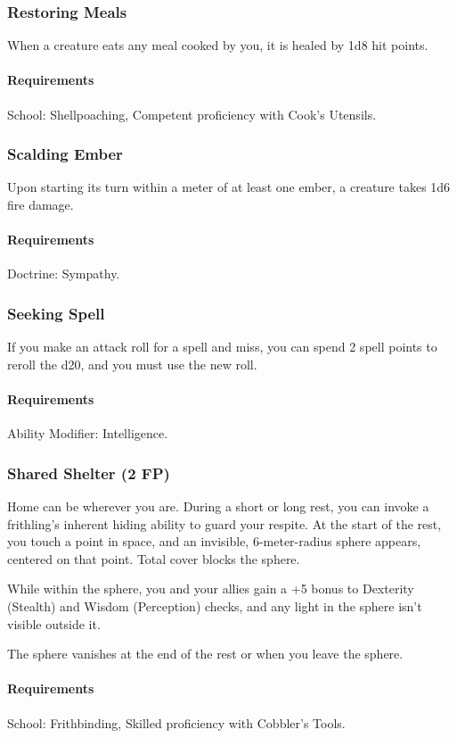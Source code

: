\subsubsection{Restoring Meals} \label{feat::restoringmeals}
    When a creature eats any meal cooked by you, it is healed by 1d8 hit points.
    \paragraph{Requirements} School: Shellpoaching, Competent proficiency with Cook's Utensils.
\subsubsection{Scalding Ember} \label{feat::scaldingember}
    Upon starting its turn within a meter of at least one ember, a creature takes 1d6 fire damage.
    \paragraph{Requirements} Doctrine: Sympathy.
\subsubsection{Seeking Spell} \label{feat::seekingspell}
    If you make an attack roll for a spell and miss, you can spend 2 spell points to reroll the d20, and you must use the new roll.
    \paragraph{Requirements} Ability Modifier: Intelligence.
\subsubsection{Shared Shelter (2 FP)} \label{feat::sharedshelter}
    Home can be wherever you are.
    During a short or long rest, you can invoke a frithling's inherent hiding ability to guard your respite.
    At the start of the rest, you touch a point in space, and an invisible, 6-meter-radius sphere appears, centered on that point.
    Total cover blocks the sphere.

    While within the sphere, you and your allies gain a +5 bonus to Dexterity (Stealth) and Wisdom (Perception) checks, and any light in the sphere isn't visible outside it.

    The sphere vanishes at the end of the rest or when you leave the sphere.
    \paragraph{Requirements} School: Frithbinding, Skilled proficiency with Cobbler's Tools.
